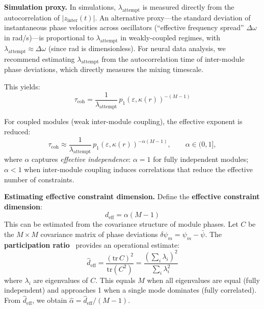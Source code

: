 \documentclass[12pt]{article}
\begin{document}
\textbf{Simulation proxy.} In simulations, $\lambda_{\mathrm{attempt}}$ is measured directly from the autocorrelation of $|z_{\mathrm{inter}}(t)|$. An alternative proxy---the standard deviation of instantaneous phase velocities across oscillators (``effective frequency spread'' $\Delta\omega$ in rad/s)---is proportional to $\lambda_{\mathrm{attempt}}$ in weakly-coupled regimes, with $\lambda_{\mathrm{attempt}} \approx \Delta\omega$ (since rad is dimensionless). For neural data analysis, we recommend estimating $\lambda_{\mathrm{attempt}}$ from the autocorrelation time of inter-module phase deviations, which directly measures the mixing timescale.

This yields:
\begin{equation}\label{eq:coh-time-exact}
\tau_{\mathrm{coh}} = \frac{1}{\lambda_{\mathrm{attempt}}}\,p_1(\varepsilon, \kappa(r))^{-(M-1)}
\end{equation}

For coupled modules (weak inter-module coupling), the effective exponent is reduced:
\begin{equation}\label{eq:coh-time}
\boxed{\tau_{\mathrm{coh}} \approx \frac{1}{\lambda_{\mathrm{attempt}}}\,p_1(\varepsilon, \kappa(r))^{-\alpha(M-1)}},\qquad \alpha\in(0,1],
\end{equation}
where $\alpha$ captures \emph{effective independence}: $\alpha = 1$ for fully independent modules; $\alpha < 1$ when inter-module coupling induces correlations that reduce the effective number of constraints.

\textbf{Estimating effective constraint dimension.} Define the \textbf{effective constraint dimension}:
\[
d_{\mathrm{eff}} = \alpha(M-1)
\]
This can be estimated from the covariance structure of module phases. Let $C$ be the $M \times M$ covariance matrix of phase deviations $\delta\psi_m = \psi_m - \bar{\psi}$. The \textbf{participation ratio}~\cite{cunningham2014,stringer2019} provides an operational estimate:
\begin{equation}\label{eq:deff-estimator}
\hat{d}_{\mathrm{eff}} = \frac{(\mathrm{tr}\, C)^2}{\mathrm{tr}(C^2)} = \frac{\left(\sum_i \lambda_i\right)^2}{\sum_i \lambda_i^2}
\end{equation}
where $\lambda_i$ are eigenvalues of $C$. This equals $M$ when all eigenvalues are equal (fully independent) and approaches 1 when a single mode dominates (fully correlated). From $\hat{d}_{\mathrm{eff}}$, we obtain $\hat{\alpha} = \hat{d}_{\mathrm{eff}} / (M-1)$.
\end{document}
